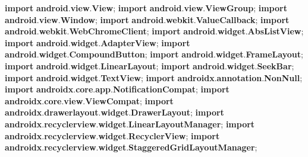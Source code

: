 \documentclass[
]{article}
\newenvironment{Shaded}{}{}
\newcommand{\ImportTok}[1]{\textcolor[rgb]{0.00,0.50,0.00}{\textbf{#1}}}
\newcommand{\KeywordTok}[1]{\textcolor[rgb]{0.00,0.44,0.13}{\textbf{#1}}}
\newcommand{\OperatorTok}[1]{\textcolor[rgb]{0.40,0.40,0.40}{#1}}
\begin{document}
\begin{Shaded}
\begin{Highlighting}[]
\KeywordTok{import} \ImportTok{android}\OperatorTok{.}\ImportTok{view}\OperatorTok{.}\ImportTok{View}\OperatorTok{;}
\KeywordTok{import} \ImportTok{android}\OperatorTok{.}\ImportTok{view}\OperatorTok{.}\ImportTok{ViewGroup}\OperatorTok{;}
\KeywordTok{import} \ImportTok{android}\OperatorTok{.}\ImportTok{view}\OperatorTok{.}\ImportTok{Window}\OperatorTok{;}
\KeywordTok{import} \ImportTok{android}\OperatorTok{.}\ImportTok{webkit}\OperatorTok{.}\ImportTok{ValueCallback}\OperatorTok{;}
\KeywordTok{import} \ImportTok{android}\OperatorTok{.}\ImportTok{webkit}\OperatorTok{.}\ImportTok{WebChromeClient}\OperatorTok{;}
\KeywordTok{import} \ImportTok{android}\OperatorTok{.}\ImportTok{widget}\OperatorTok{.}\ImportTok{AbsListView}\OperatorTok{;}
\KeywordTok{import} \ImportTok{android}\OperatorTok{.}\ImportTok{widget}\OperatorTok{.}\ImportTok{AdapterView}\OperatorTok{;}
\KeywordTok{import} \ImportTok{android}\OperatorTok{.}\ImportTok{widget}\OperatorTok{.}\ImportTok{CompoundButton}\OperatorTok{;}
\KeywordTok{import} \ImportTok{android}\OperatorTok{.}\ImportTok{widget}\OperatorTok{.}\ImportTok{FrameLayout}\OperatorTok{;}
\KeywordTok{import} \ImportTok{android}\OperatorTok{.}\ImportTok{widget}\OperatorTok{.}\ImportTok{LinearLayout}\OperatorTok{;}
\KeywordTok{import} \ImportTok{android}\OperatorTok{.}\ImportTok{widget}\OperatorTok{.}\ImportTok{SeekBar}\OperatorTok{;}
\KeywordTok{import} \ImportTok{android}\OperatorTok{.}\ImportTok{widget}\OperatorTok{.}\ImportTok{TextView}\OperatorTok{;}
\KeywordTok{import} \ImportTok{androidx}\OperatorTok{.}\ImportTok{annotation}\OperatorTok{.}\ImportTok{NonNull}\OperatorTok{;}
\KeywordTok{import} \ImportTok{androidx}\OperatorTok{.}\ImportTok{core}\OperatorTok{.}\ImportTok{app}\OperatorTok{.}\ImportTok{NotificationCompat}\OperatorTok{;}
\KeywordTok{import} \ImportTok{androidx}\OperatorTok{.}\ImportTok{core}\OperatorTok{.}\ImportTok{view}\OperatorTok{.}\ImportTok{ViewCompat}\OperatorTok{;}
\KeywordTok{import} \ImportTok{androidx}\OperatorTok{.}\ImportTok{drawerlayout}\OperatorTok{.}\ImportTok{widget}\OperatorTok{.}\ImportTok{DrawerLayout}\OperatorTok{;}
\KeywordTok{import} \ImportTok{androidx}\OperatorTok{.}\ImportTok{recyclerview}\OperatorTok{.}\ImportTok{widget}\OperatorTok{.}\ImportTok{LinearLayoutManager}\OperatorTok{;}
\KeywordTok{import} \ImportTok{androidx}\OperatorTok{.}\ImportTok{recyclerview}\OperatorTok{.}\ImportTok{widget}\OperatorTok{.}\ImportTok{RecyclerView}\OperatorTok{;}
\KeywordTok{import} \ImportTok{androidx}\OperatorTok{.}\ImportTok{recyclerview}\OperatorTok{.}\ImportTok{widget}\OperatorTok{.}\ImportTok{StaggeredGridLayoutManager}\OperatorTok{;}

\end{Highlighting}
\end{Shaded}
\end{document}
